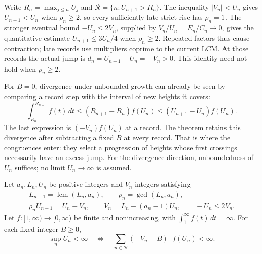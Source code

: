 Write $R_n=\max_{j\le n}U_j$ and
$\mathcal R=\{n:U_{n+1}>R_n\}$.  The inequality $|V_n|<U_n$ gives
$U_{n+1}<U_n$ when $\rho_n\ge2$, so every sufficiently late strict rise has
$\rho_n=1$.  The stronger eventual bound $-U_n\le2V_n$, supplied by
$V_n/U_n=E_n/C_n\to0$, gives the quantitative estimate
$U_{n+1}\le3U_n/4$ when $\rho_n\ge2$.
Repeated factors thus cause contraction; late records use multipliers
coprime to the current LCM. At those records the actual jump is
$d_n=U_{n+1}-U_n=-V_n>0$. This identity need not hold when $\rho_n\ge2$.

For $B=0$, divergence under unbounded growth can already be seen by
comparing a record step with the interval of new heights it covers:
\[
 \int_{R_n}^{R_{n+1}}f(t)\,dt
 \le (R_{n+1}-R_n)f(U_n)
 \le (U_{n+1}-U_n)f(U_n).
\]
The last expression is $(-V_n)f(U_n)$ at a record. The theorem retains
this divergence after subtracting a fixed $B$ at every record. That is
where the congruences enter: they select a progression of heights whose
first crossings necessarily have an excess jump. For the divergence direction, unboundedness of $U_n$ suffices; no
limit $U_n\to\infty$ is assumed.

\begin{theorem}\label{long243:res:arithmeticrecord}
Let $a_n,L_n,U_n$ be positive integers and $V_n$ integers satisfying
\[
 \begin{gathered}
 L_{n+1}=\operatorname{lcm}(L_n,a_n),\qquad \rho_n=\gcd(L_n,a_n),\\
 \rho_nU_{n+1}=U_n-V_n,\qquad
 V_n=L_n-(a_n-1)U_n,\qquad -U_n\le2V_n.
 \end{gathered}
\]
Let $f:[1,\infty)\to[0,\infty)$ be finite and nonincreasing, with
$\int_1^\infty f(t)\,dt=\infty$. For each fixed integer $B\ge0$,
\[
 \sup_n U_n<\infty
 \quad\Longleftrightarrow\quad
 \sum_{n\in\mathcal R}(-V_n-B)_+f(U_n)<\infty.
\]
\end{theorem}

